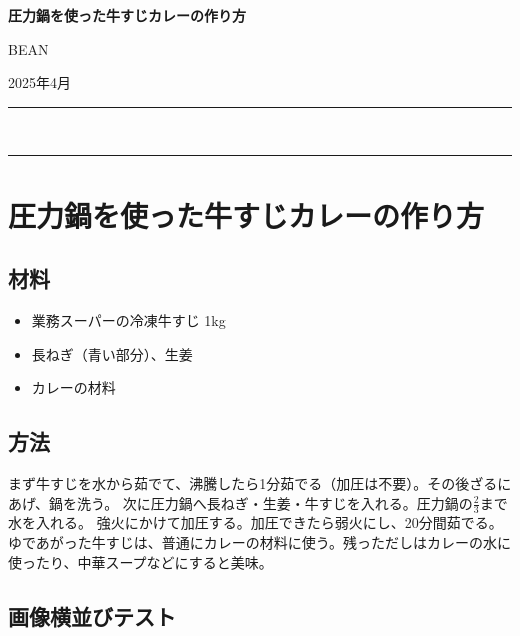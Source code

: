 \documentclass[
  12pt,
  a4paper,
  oneside,    %
]{article}
\providecommand{\tightlist}{%
  \setlength{\itemsep}{0pt}\setlength{\parskip}{0pt}} %
\begin{document}
\raggedbottom
\begin{center}
  {\huge\bfseries 圧力鍋を使った牛すじカレーの作り方} \par
        \vspace{1em}
    {\large BEAN} \par
        {\normalsize 2025年4月} \par
  \vspace{0.5em}
  {\color{gray!70}\rule{\textwidth}{0.5pt}}\\[-0.7em]
  {\color{gray!70}\rule{\textwidth}{0.5pt}}
\end{center}
\vspace{2em}

\section{圧力鍋を使った牛すじカレーの作り方}\label{ux5727ux529bux934bux3092ux4f7fux3063ux305fux725bux3059ux3058ux30abux30ecux30fcux306eux4f5cux308aux65b9}

\subsection{材料}\label{ux6750ux6599}

\begin{itemize}
\tightlist
\item
  業務スーパーの冷凍牛すじ 1kg
\item
  長ねぎ（青い部分）、生姜
\item
  カレーの材料
\end{itemize}

\subsection{方法}\label{ux65b9ux6cd5}

まず牛すじを水から茹でて、沸騰したら1分茹でる（加圧は不要）。その後ざるにあげ、鍋を洗う。
次に圧力鍋へ長ねぎ・生姜・牛すじを入れる。圧力鍋の\(\textstyle\frac{2}{3}\)まで水を入れる。
強火にかけて加圧する。加圧できたら弱火にし、20分間茹でる。
ゆであがった牛すじは、普通にカレーの材料に使う。残っただしはカレーの水に使ったり、中華スープなどにすると美味。

\subsection{画像横並びテスト}\label{ux753bux50cfux6a2aux4e26ux3073ux30c6ux30b9ux30c8}
\end{document}
